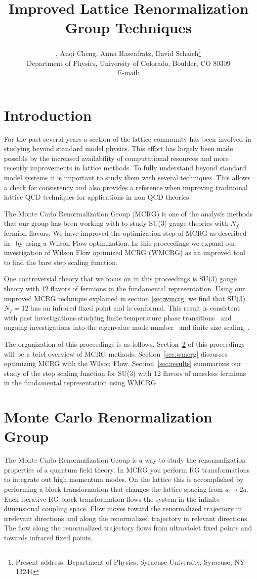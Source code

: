 \documentclass{PoS}
\title{Improved Lattice Renormalization Group Techniques}
\author{\speaker{Gregory Petropoulos}, Anqi Cheng, Anna Hasenfratz, David Schaich\footnote{Present address: Department of Physics, Syracuse University, Syracuse, NY 13244} \\
        Department of Physics, University of Colorado, Boulder, CO 80309 \\
        E-mail: \email{gregory.petropoulos@colorado.edu}}
\newcommand{\secref}[1]{Section~\ref{#1}}
\newcommand{\TODO}[1]{\textcolor{red}{{\bf #1}}}
\begin{document}
\section{Introduction}
For the past several years a section of the lattice community has been involved in studying beyond standard model physics.
This effort has largely been made possible by the increased availability of computational resources and more recently improvements in lattice methods.
To fully understand beyond standard model systems it is important to study them with several techniques.
This allows a check for consistency and also provides a reference when improving traditional lattice QCD techniques for applications in non QCD theories.

The Monte Carlo Renormalization Group (MCRG) is one of the analysis methods that our group has been working with to study SU(3) gauge theories with $N_f$ fermion flavors.
We have improved the optimization step of MCRG as described in~\cite{Petropoulos:2012mg} by using a Wilson Flow optimization.
In this proceedings we expand our investigation of Wilson Flow optimized MCRG (WMCRG) as an improved tool to find the bare step scaling function.

One controversial theory that we focus on in this proceedings is SU(3) gauge theory with 12 flavors of fermions in the fundamental representation.
Using our improved MCRG technique explained in section \ref{sec:wmcrg} we find that SU(3) $N_f = 12$ has an infrared fixed point and is conformal.
This result is consistent with past investigations studying finite temperature phase transitions~\TODO{\cite{}} and ongoing investigations into the eigenvalue mode number~\TODO{\cite{}} and finite size scaling~\TODO{\cite{}}.

The organization of this proceedings is as follows.
\secref{sec:mcrg} of this proceedings will be a brief overview of MCRG methods.
\secref{sec:wmcrg} discusses optimizing MCRG with the Wilson Flow.
\secref{sec:results} summarizes our study of the step scaling function for SU(3) with 12 flavors of massless fermions in the fundamental representation using WMCRG.



\section{Monte Carlo Renormalization Group}
\label{sec:mcrg}
The Monte Carlo Renormalization Group is a way to study the renormalization properties of a quantum field theory.
In MCRG you perform RG transformations to integrate out high momentum modes.
On the lattice this is accomplished by performing a block transformation that changes the lattice spacing from $a \to 2a$.
Each iterative RG block transformation flows the system in the infinite dimensional coupling space.
Flow moves toward the renormalized trajectory in irrelevant directions and along the renormalized trajectory in relevant directions.
The flow along the renormalized trajectory flows from ultraviolet fixed points and towards infrared fixed points.
\end{document}
